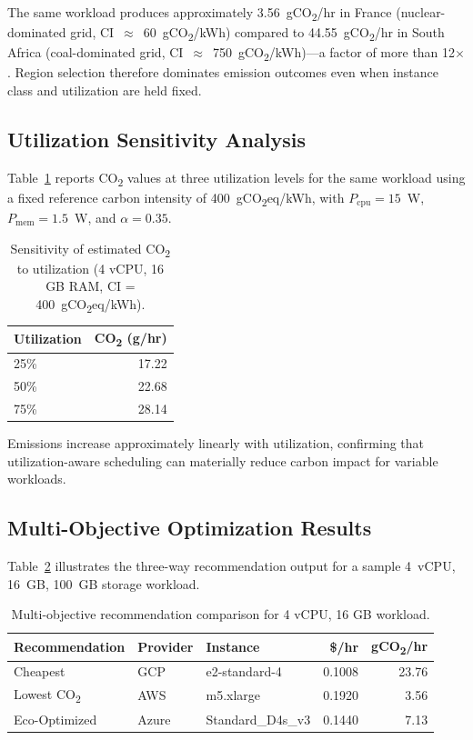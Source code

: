 \documentclass[12pt]{article}
\begin{document}
The same workload produces approximately 3.56~gCO\textsubscript{2}/hr in France (nuclear-dominated grid, CI~$\approx$~60~gCO\textsubscript{2}/kWh) compared to 44.55~gCO\textsubscript{2}/hr in South Africa (coal-dominated grid, CI~$\approx$~750~gCO\textsubscript{2}/kWh)---a factor of more than 12$\times$. Region selection therefore dominates emission outcomes even when instance class and utilization are held fixed.

\subsection{Utilization Sensitivity Analysis}
Table~\ref{tab:utilization_sensitivity} reports CO\textsubscript{2} values at three utilization levels for the same workload using a fixed reference carbon intensity of 400~gCO\textsubscript{2}eq/kWh, with $P_{\text{cpu}}=15$~W, $P_{\text{mem}}=1.5$~W, and $\alpha=0.35$.

\begin{table}[!t]
\centering
\caption{Sensitivity of estimated CO\textsubscript{2} to utilization (4 vCPU, 16 GB RAM, CI = 400~gCO\textsubscript{2}eq/kWh).}
\label{tab:utilization_sensitivity}
\small
\begin{tabular}{lr}
\toprule
\textbf{Utilization} & \textbf{CO\textsubscript{2} (g/hr)} \\
\midrule
25\% & 17.22 \\
50\% & 22.68 \\
75\% & 28.14 \\
\bottomrule
\end{tabular}
\end{table}

Emissions increase approximately linearly with utilization, confirming that utilization-aware scheduling can materially reduce carbon impact for variable workloads.

\subsection{Multi-Objective Optimization Results}
Table~\ref{tab:pareto_results} illustrates the three-way recommendation output for a sample 4~vCPU, 16~GB, 100~GB storage workload.

\begin{table}[!t]
\centering
\caption{Multi-objective recommendation comparison for 4 vCPU, 16 GB workload.}
\label{tab:pareto_results}
\small
\begin{tabular}{lllrr}
\toprule
\textbf{Recommendation} & \textbf{Provider} & \textbf{Instance} & \textbf{\$/hr} & \textbf{gCO\textsubscript{2}/hr} \\
\midrule
Cheapest & GCP & e2-standard-4 & 0.1008 & 23.76 \\
Lowest CO\textsubscript{2} & AWS & m5.xlarge & 0.1920 & 3.56 \\
Eco-Optimized & Azure & Standard\_D4s\_v3 & 0.1440 & 7.13 \\
\bottomrule
\end{tabular}
\end{table}
\end{document}
